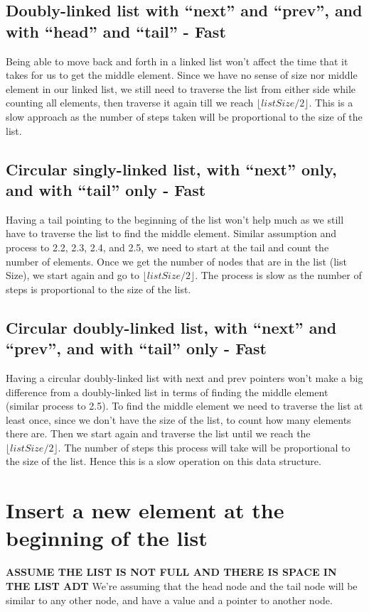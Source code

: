 \documentclass{article}
\begin{document}
\subsection{Doubly-linked list with “next” and “prev”, and with “head” and “tail” - Fast}
Being able to move back and forth in a linked list won't affect the time that it takes for us to get the middle element. Since we have no sense of size nor middle element in our linked list, we still need to traverse the list from either side while counting all elements, then traverse it again till we reach $\lfloor {listSize/2} \rfloor$. This is a slow approach as the number of steps taken will be proportional to the size of the list.

\subsection{Circular singly-linked list, with “next” only, and with “tail” only - Fast}
Having a tail pointing to the beginning of the list won't help much as we still have to traverse the list to find the middle element. Similar assumption and process to 2.2, 2.3, 2.4, and 2.5, we need to start at the tail and count the number of elements. Once we get the number of nodes that are in the list (list Size), we start again and go to $\lfloor {listSize/2} \rfloor$. The process is slow as the number of steps is proportional to the size of the list. 

\subsection{Circular doubly-linked list, with “next” and “prev”, and with “tail” only - Fast}
Having a circular doubly-linked list with next and prev pointers won't make a big difference from a doubly-linked list in terms of finding the middle element (similar process to 2.5). To find the middle element we need to traverse the list at least once, since we don't have the size of the list, to count how many elements there are. Then we start again and traverse the list until we reach the $\lfloor {listSize/2} \rfloor$. The number of steps this process will take will be proportional to the size of the list. Hence this is a slow operation on this data structure.



\section{Insert a new element at the beginning of the list}
\textbf{ASSUME THE LIST IS NOT FULL AND THERE IS SPACE IN THE LIST ADT}
We're assuming that the head node and the tail node will be similar to any other node, and have a value and a pointer to another node.
\end{document}
